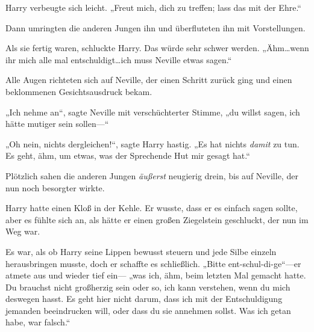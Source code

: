 Harry verbeugte sich leicht. „Freut mich, dich zu treffen; lass das mit der Ehre.“

Dann umringten die anderen Jungen ihn und überfluteten ihn mit Vorstellungen.

Als sie fertig waren, schluckte Harry. Das würde sehr schwer werden. „Ähm…wenn ihr mich alle mal entschuldigt…ich muss Neville etwas sagen.“

Alle Augen richteten sich auf Neville, der einen Schritt zurück ging und einen beklommenen Gesichtsausdruck bekam.

„Ich nehme an“, sagte Neville mit verschüchterter Stimme, „du willst sagen, ich hätte mutiger sein sollen—“

„Oh nein, nichts dergleichen!“, sagte Harry hastig. „Es hat nichts \emph{damit} zu tun. Es geht, ähm, um etwas, was der Sprechende Hut mir gesagt hat.“

Plötzlich sahen die anderen Jungen \emph{äußerst} neugierig drein, bis auf Neville, der nun noch besorgter wirkte.

Harry hatte einen Kloß in der Kehle. Er wusste, dass er es einfach sagen sollte, aber es fühlte sich an, als hätte er einen großen Ziegelstein geschluckt, der nun im Weg war.

Es war, als ob Harry seine Lippen bewusst steuern und jede Silbe einzeln herausbringen musste, doch er schaffte es schließlich. „Bitte ent-schul-di-ge“—er atmete aus und wieder tief ein— „was ich, ähm, beim letzten Mal gemacht hatte. Du brauchst nicht großherzig sein oder so, ich kann verstehen, wenn du mich deswegen hasst. Es geht hier nicht darum, dass ich mit der Entschuldigung jemanden beeindrucken will, oder dass du sie annehmen sollst. Was ich getan habe, war falsch.“

